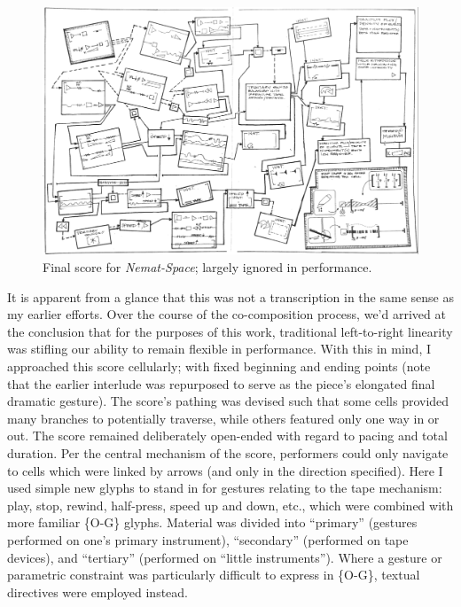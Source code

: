         \begin{figure}
            \centering
            \includegraphics[width=.9\textwidth]{images/chapter4/nemat-space-small-min.png}
            \captionsetup{width=.5\textwidth}
            \caption{Final score for \textit{Nemat-Space}; largely ignored in performance.}
            \label{fig:nematfinal}
        \end{figure}        

    It is apparent from a glance that this was not a transcription in the same sense as my earlier efforts. Over the course of the co-composition process, we'd arrived at the conclusion that for the purposes of this work, traditional left-to-right linearity was stifling our ability to remain flexible in performance. With this in mind, I approached this score cellularly; with fixed beginning and ending points (note that the earlier interlude was repurposed to serve as the piece's elongated final dramatic gesture). The score's pathing was devised such that some cells provided many branches to potentially traverse, while others featured only one way in or out. The score remained deliberately open-ended with regard to pacing and total duration. Per the central mechanism of the score, performers could only navigate to cells which were linked by arrows (and only in the direction specified). Here I used simple new glyphs to stand in for gestures relating to the tape mechanism: play, stop, rewind, half-press, speed up and down, etc., which were combined with more familiar \{O-G\} glyphs. Material was divided into ``primary'' (gestures performed on one's primary instrument), ``secondary'' (performed on tape devices), and ``tertiary'' (performed on ``little instruments''). Where a gesture or parametric constraint was particularly difficult to express in \{O-G\}, textual directives were employed instead. 
        
